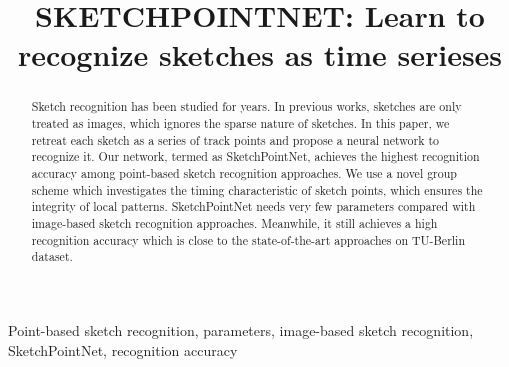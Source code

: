 \documentclass{article}
\title{SKETCHPOINTNET: Learn to recognize sketches as time serieses}
\begin{document}
%
\maketitle
%
\begin{abstract}
Sketch recognition has been studied for years. In previous works, sketches are only treated as images, which ignores the sparse nature of sketches. In this paper, we retreat each sketch as a series of track points and propose a neural network to recognize it. Our network, termed as SketchPointNet, achieves the highest recognition accuracy among point-based sketch recognition approaches. We use a novel group scheme which investigates the timing characteristic of sketch points, which ensures the integrity of local patterns. SketchPointNet needs very few parameters compared with image-based sketch recognition approaches. Meanwhile, it still achieves a high recognition accuracy which is close to the state-of-the-art approaches on TU-Berlin dataset.
\end{abstract}

\begin{keywords}
Point-based sketch recognition, parameters, image-based sketch recognition, SketchPointNet, recognition accuracy
\end{keywords}







\end{document}
